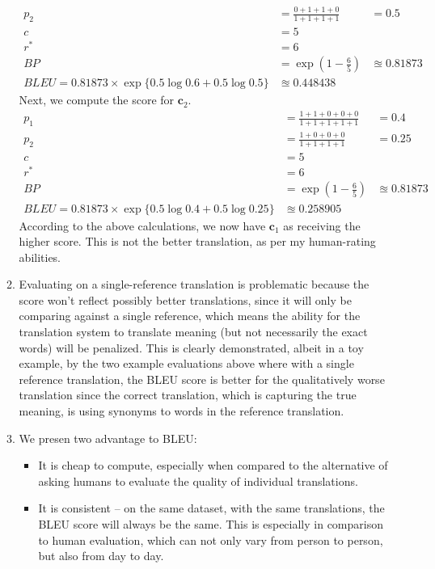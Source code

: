 \documentclass[12pt]{article}
\begin{document}
\begin{enumerate}[label=(\alph*)]
\begin{enumerate}[label=\roman*]
\begin{align*}
          p_2 &= \frac{0 + 1 + 1 + 0 }{1 + 1 + 1 + 1} &= 0.5  \\
          c &= 5 \\
          r^* &= 6 \\
          BP &= \exp(1 - \frac{6}{5}) &\approxeq 0.81873 \\
          BLEU = 0.81873 \times \exp\{ 0.5\log 0.6 + 0.5\log 0.5  \} &\approxeq 0.448438
        \end{align*}
        Next, we compute the score for $\bm{c}_2$.
        \begin{align*}
          p_1 &= \frac{1 + 1 + 0 + 0 + 0}{1 + 1 + 1 + 1 + 1} &= 0.4 \\
          p_2 &= \frac{1 + 0 + 0 + 0 }{1 + 1 + 1 + 1} &= 0.25  \\
          c &= 5 \\
          r^* &= 6 \\
          BP &= \exp(1 - \frac{6}{5}) &\approxeq 0.81873 \\
          BLEU = 0.81873  \times \exp\{ 0.5\log 0.4 + 0.5\log 0.25  \} &\approxeq 0.258905
        \end{align*} 
        According to the above calculations, we now have $\bm{c}_1$ as receiving the higher score. This is not the better translation, as per my human-rating abilities. 
      \item Evaluating on a single-reference translation is problematic because the score won't reflect possibly better translations, since it will only be comparing against a single reference, which means the ability for the translation system to translate meaning (but not necessarily the exact words) will be penalized. This is clearly demonstrated, albeit in a toy example, by the two example evaluations above where with a single reference translation, the BLEU score is better for the qualitatively worse translation since the correct translation, which is capturing the true meaning, is using synonyms to words in the reference translation.
      \item 
        We presen two advantage to BLEU:
          \begin{itemize}
            \item It is cheap to compute, especially when compared to the alternative of asking humans to evaluate the quality of individual translations.
            \item It is consistent -- on the same dataset, with the same translations, the BLEU score will always be the same. This is especially in comparison to human evaluation, which can not only vary from person to person, but also from day to day.
          \end{itemize}


\end{enumerate}
\end{enumerate}
\end{document}
